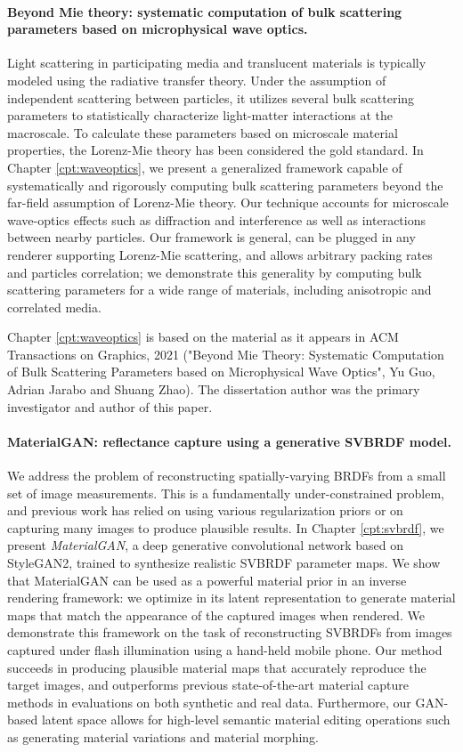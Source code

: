 \paragraph{Beyond Mie theory: systematic computation of bulk scattering parameters based on microphysical wave optics.}
Light scattering in participating media and translucent materials is typically modeled using the radiative transfer theory. Under the assumption of independent scattering between particles, it utilizes several bulk scattering parameters to statistically characterize light-matter interactions at the macroscale. To calculate these parameters based on microscale material properties, the Lorenz-Mie theory has been considered the gold standard.
In Chapter \ref{cpt:waveoptics}, we present a generalized framework capable of systematically and rigorously computing bulk scattering parameters beyond the far-field assumption of Lorenz-Mie theory. Our technique accounts for microscale wave-optics effects such as diffraction and interference as well as interactions between nearby particles. Our framework is general, can be plugged in any renderer supporting Lorenz-Mie scattering, and allows arbitrary packing rates and particles correlation; we demonstrate this generality by computing bulk scattering parameters for a wide range of materials, including anisotropic and correlated media.

Chapter \ref{cpt:waveoptics} is based on the material as it appears in ACM Transactions on Graphics, 2021
("Beyond Mie Theory: Systematic Computation of Bulk Scattering Parameters based on Microphysical Wave Optics", Yu Guo, Adrian Jarabo and Shuang Zhao). The dissertation author was the primary investigator and author of this paper.

\paragraph{MaterialGAN: reflectance capture using a generative SVBRDF model.}
We address the problem of reconstructing spatially-varying BRDFs from a small set of image measurements. This is a fundamentally under-constrained problem, and previous work has relied on using various regularization priors or on capturing many images to produce plausible results.
In Chapter \ref{cpt:svbrdf}, we present \emph{MaterialGAN}, a deep generative convolutional network based on StyleGAN2, trained to synthesize realistic SVBRDF parameter maps. We show that MaterialGAN can be used as a powerful material prior in an inverse rendering framework: we optimize in its latent representation to generate material maps that match the appearance of the captured images when rendered. We demonstrate this framework on the task of reconstructing SVBRDFs from images captured under flash illumination using a hand-held mobile phone. Our method succeeds in producing plausible material maps that accurately reproduce the target images, and outperforms previous state-of-the-art material capture methods in evaluations on both synthetic and real data. Furthermore, our GAN-based latent space allows for high-level semantic material editing operations such as generating material variations and material morphing.

